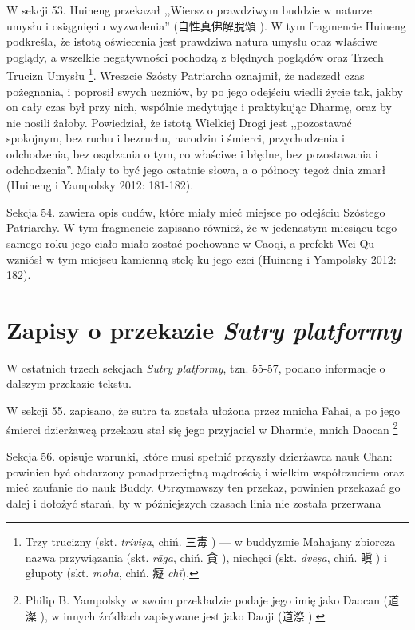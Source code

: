 W sekcji 53. Huineng przekazał ,,Wiersz o prawdziwym buddzie w naturze umysłu i osiągnięciu wyzwolenia'' (自性真佛解脫頌 ).
W tym fragmencie Huineng podkreśla, że istotą oświecenia jest prawdziwa natura umysłu oraz właściwe poglądy, a wszelkie negatywności pochodzą z błędnych poglądów oraz Trzech Trucizn Umysłu%
\footnote{Trzy trucizny\label{SanDu} (skt. \textit{trivi\d{s}a}, chiń. 三毒 ) --- w buddyzmie Mahajany zbiorcza nazwa przywiązania (skt. \textit{rāga}, chiń. 貪 ), niechęci (skt. \textit{dve\d{s}a}, chiń. 瞋 ) i głupoty (skt. \textit{moha}, chiń. 癡 \textit{chī}).}.
Wreszcie Szósty Patriarcha oznajmił, że nadszedł czas pożegnania, i poprosił swych uczniów, by po jego odejściu wiedli życie tak, jakby on cały czas był przy nich, wspólnie medytując i praktykując Dharmę, oraz by nie nosili żałoby.
Powiedział, że istotą Wielkiej Drogi jest ,,pozostawać spokojnym, bez ruchu i bezruchu, narodzin i śmierci, przychodzenia i odchodzenia, bez osądzania o tym, co właściwe i błędne, bez pozostawania i odchodzenia''.
Miały to być jego ostatnie słowa, a o północy tegoż dnia zmarł
(Huineng i Yampolsky 2012: 181-182).

Sekcja 54. zawiera opis cudów, które miały mieć miejsce po odejściu Szóstego Patriarchy.
W tym fragmencie zapisano również, że w jedenastym miesiącu tego samego roku jego ciało miało zostać pochowane w Caoqi, a prefekt Wei Qu wzniósł w tym miejscu kamienną stelę ku jego czci
(Huineng i Yampolsky 2012: 182).

\section{Zapisy o przekazie \textit{Sutry platformy}}
W ostatnich trzech sekcjach \textit{Sutry platformy}, tzn. 55-57, podano informacje o dalszym przekazie tekstu.

W sekcji 55. zapisano, że sutra ta została ułożona przez mnicha Fahai, a po jego śmierci dzierżawcą przekazu stał się jego przyjaciel w Dharmie, mnich Daocan%
\footnote{Philip B. Yampolsky w swoim przekładzie podaje jego imię jako Daocan (道澯 ), w innych źródłach zapisywane jest jako Daoji (道漈 ).}

Sekcja 56. opisuje warunki, które musi spełnić przyszły dzierżawca nauk Chan: powinien być obdarzony ponadprzeciętną mądrością i wielkim współczuciem oraz mieć zaufanie do nauk Buddy.
Otrzymawszy ten przekaz, powinien przekazać go dalej i dołożyć starań, by w późniejszych czasach linia nie została przerwana

